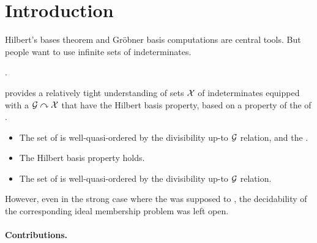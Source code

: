 \section{Introduction}
\label{sec:intro}

Hilbert’s bases theorem and Gröbner basis computations
are central tools. But people want to use infinite sets
of indeterminates.

\cite{CLO15}
\cite{KS91}
\cite{KRTH90}
\cite{BRDR11,HIKRLE18}.



\cite{GHOLAS24} provides a relatively tight understanding of sets $\mathcal{X}$ of
indeterminates equipped with a  $\mathcal{G} \curvearrowright \mathcal{X}$
that have the Hilbert basis property, based on a property of the
 of .

\begin{itemize}
    \item The set of  is well-quasi-ordered
        by the divisibility up-to $\mathcal{G}$ relation,
        and the  .
    \item The Hilbert basis property holds.
    \item The set of  is well-quasi-ordered
        by the divisibility up-to $\mathcal{G}$ relation.
\end{itemize}


However, even in the strong case where the  was supposed to
, the decidability of the corresponding ideal
membership problem was left open.

\paragraph{Contributions.}

